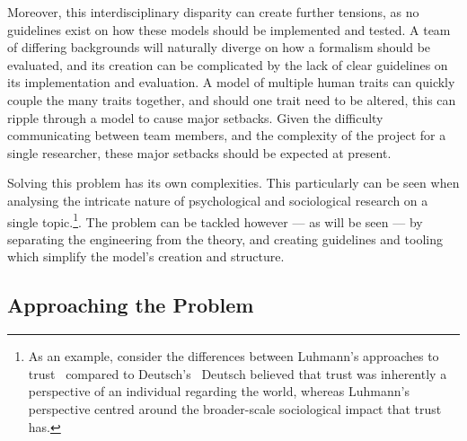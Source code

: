 
Moreover, this interdisciplinary disparity can create further tensions, as no guidelines exist on how these models should be implemented and tested. A team of differing backgrounds will naturally diverge on how a formalism should be evaluated, and its creation can be complicated by the lack of clear guidelines on its implementation and evaluation. A model of multiple human traits can quickly couple the many traits together, and should one trait need to be altered, this can ripple through a model to cause major setbacks. Given the difficulty communicating between team members, and the complexity of the project for a single researcher, these major setbacks should be expected at present.\par

Solving this problem has its own complexities. This particularly can be seen when analysing the intricate nature of psychological and sociological research on a single topic.\footnote{As an example, consider the differences between Luhmann's approaches to trust~\cite{luhmann2000familiarity} compared to Deutsch's~\cite{deutsch1962cooperation} Deutsch believed that trust was inherently a perspective of an individual regarding the world, whereas Luhmann's perspective centred around the broader-scale sociological impact that trust has.}. The problem can be tackled however --- as will be seen --- by separating the engineering from the theory, and creating guidelines and tooling which simplify the model's creation and structure.\par
\subsection{Approaching the Problem}\label{sec:approaching_the_problem}

